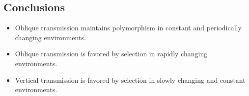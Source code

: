 \documentclass[a0,landscape]{a0poster}
\begin{document}
\begin{multicols}{4}

\section*{Conclusions}

\begin{itemize}
\item Oblique transmission maintains polymorphism in constant and periodically changing environments.
\item Oblique transmission is favored by selection in rapidly changing environments.
\item Vertical transmission is favored by selection in slowly changing and constant environments.
\end{itemize}





\end{multicols}
\end{document}
